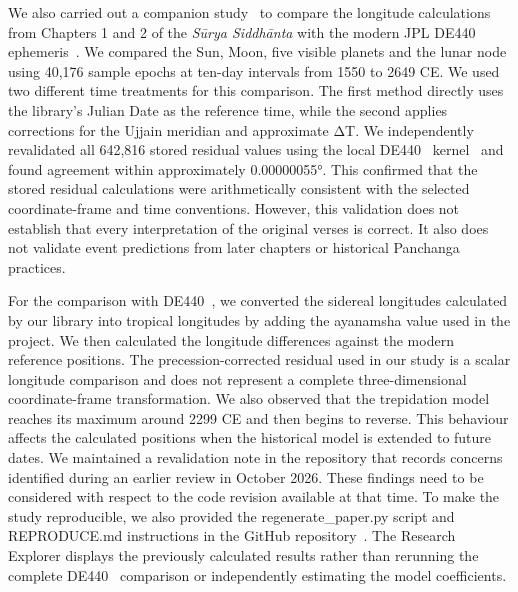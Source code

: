 \documentclass[12pt,a4paper,oneside]{report}
\newcommand{\surya}{Sūrya Siddhānta\xspace}
\begin{document}
We also carried out a companion study~\cite{nigam2026de440} to compare the longitude calculations from Chapters 1 and 2 of the \emph{\surya} with the modern JPL DE440 ephemeris~\cite{Park2021DE440}. We compared the Sun, Moon, five visible planets and the lunar node using 40,176 sample epochs at ten-day intervals from 1550 to 2649 CE. We used two different time treatments for this comparison. The first method directly uses the library's Julian Date as the reference time, while the second applies corrections for the Ujjain meridian and approximate ΔT. We independently revalidated all 642,816 stored residual values using the local DE440~\cite{Park2021DE440} kernel~\cite{jplephem,acton1996} and found agreement within approximately 0.00000055°. This confirmed that the stored residual calculations were arithmetically consistent with the selected coordinate-frame and time conventions. However, this validation does not establish that every interpretation of the original verses is correct. It also does not validate event predictions from later chapters or historical Panchanga practices.

For the comparison with DE440~\cite{Park2021DE440}, we converted the sidereal longitudes calculated by our library into tropical longitudes by adding the ayanamsha value used in the project. We then calculated the longitude differences against the modern reference positions. The precession-corrected residual used in our study is a scalar longitude comparison and does not represent a complete three-dimensional coordinate-frame transformation. We also observed that the trepidation model reaches its maximum around 2299 CE and then begins to reverse. This behaviour affects the calculated positions when the historical model is extended to future dates. We maintained a revalidation note in the repository that records concerns identified during an earlier review in October 2026. These findings need to be considered with respect to the code revision available at that time. To make the study reproducible, we also provided the regenerate\_paper.py script and REPRODUCE.md instructions in the GitHub repository~\cite{nigam_repo}. The Research Explorer displays the previously calculated results rather than rerunning the complete DE440~\cite{Park2021DE440} comparison or independently estimating the model coefficients.
\end{document}
